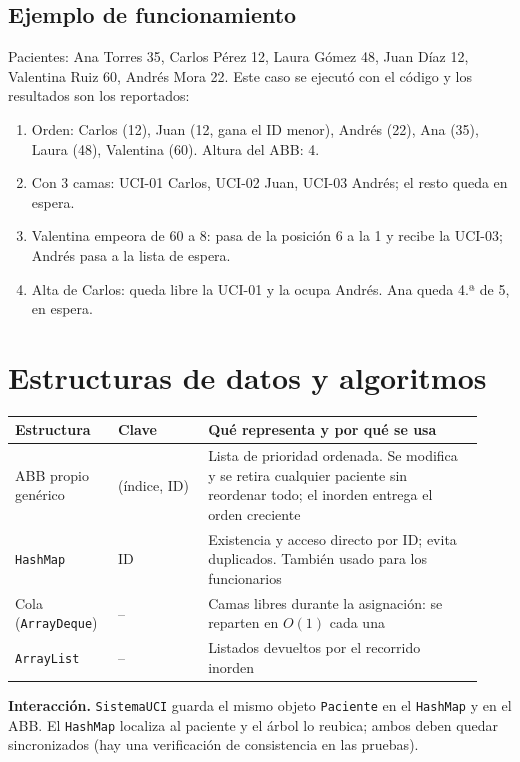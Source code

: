 \documentclass[11pt,a4paper]{article}
\begin{document}
\subsection{Ejemplo de funcionamiento}
Pacientes: Ana Torres 35, Carlos Pérez 12, Laura Gómez 48, Juan Díaz 12, Valentina Ruiz 60, Andrés Mora 22. Este caso se ejecutó con el código y los resultados son los reportados:
\begin{enumerate}[nosep]
\item Orden: Carlos (12), Juan (12, gana el ID menor), Andrés (22), Ana (35), Laura (48), Valentina (60). Altura del ABB: 4.
\item Con 3 camas: UCI-01 Carlos, UCI-02 Juan, UCI-03 Andrés; el resto queda en espera.
\item Valentina empeora de 60 a 8: pasa de la posición 6 a la 1 y recibe la UCI-03; Andrés pasa a la lista de espera.
\item Alta de Carlos: queda libre la UCI-01 y la ocupa Andrés. Ana queda 4.ª de 5, en espera.
\end{enumerate}

\section{Estructuras de datos y algoritmos}\label{sec:ed}
\begin{longtable}{@{}p{0.2\linewidth}p{0.18\linewidth}p{0.55\linewidth}@{}}
\toprule \textbf{Estructura} & \textbf{Clave} & \textbf{Qué representa y por qué se usa}\\ \midrule \endhead
ABB propio genérico & (índice, ID) & Lista de prioridad ordenada. Se modifica y se retira cualquier paciente sin reordenar todo; el inorden entrega el orden creciente\\
\texttt{HashMap} & ID & Existencia y acceso directo por ID; evita duplicados. También usado para los funcionarios\\
Cola (\texttt{ArrayDeque}) & -- & Camas libres durante la asignación: se reparten en $O(1)$ cada una\\
\texttt{ArrayList} & -- & Listados devueltos por el recorrido inorden\\
\bottomrule
\end{longtable}
\textbf{Interacción.} \texttt{SistemaUCI} guarda el mismo objeto \texttt{Paciente} en el \texttt{HashMap} y en el ABB. El \texttt{HashMap} localiza al paciente y el árbol lo reubica; ambos deben quedar sincronizados (hay una verificación de consistencia en las pruebas).
\end{document}

